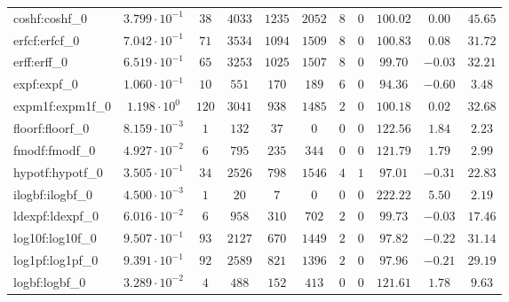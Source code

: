 \begin{tabular}{|l|c|c|c|c|c|c|c|c|c|c|}
coshf:coshf\_0               & $ 3.799 \cdot 10^{-1} $ & $ 38     $ & $ 4033  $ & $ 1235  $ & $ 2052  $ & $ 8   $ & $ 0 $ & $ 100.02      $ & $ 0.00    $ & $ 45.65   $ \\
erfcf:erfcf\_0               & $ 7.042 \cdot 10^{-1} $ & $ 71     $ & $ 3534  $ & $ 1094  $ & $ 1509  $ & $ 8   $ & $ 0 $ & $ 100.83      $ & $ 0.08    $ & $ 31.72   $ \\
erff:erff\_0                 & $ 6.519 \cdot 10^{-1} $ & $ 65     $ & $ 3253  $ & $ 1025  $ & $ 1507  $ & $ 8   $ & $ 0 $ & $ 99.70       $ & $ -0.03   $ & $ 32.21   $ \\
expf:expf\_0                 & $ 1.060 \cdot 10^{-1} $ & $ 10     $ & $ 551   $ & $ 170   $ & $ 189   $ & $ 6   $ & $ 0 $ & $ 94.36       $ & $ -0.60   $ & $ 3.48    $ \\
expm1f:expm1f\_0             & $ 1.198 \cdot 10^{0}  $ & $ 120    $ & $ 3041  $ & $ 938   $ & $ 1485  $ & $ 2   $ & $ 0 $ & $ 100.18      $ & $ 0.02    $ & $ 32.68   $ \\
floorf:floorf\_0             & $ 8.159 \cdot 10^{-3} $ & $ 1      $ & $ 132   $ & $ 37    $ & $ 0     $ & $ 0   $ & $ 0 $ & $ 122.56      $ & $ 1.84    $ & $ 2.23    $ \\
fmodf:fmodf\_0               & $ 4.927 \cdot 10^{-2} $ & $ 6      $ & $ 795   $ & $ 235   $ & $ 344   $ & $ 0   $ & $ 0 $ & $ 121.79      $ & $ 1.79    $ & $ 2.99    $ \\
hypotf:hypotf\_0             & $ 3.505 \cdot 10^{-1} $ & $ 34     $ & $ 2526  $ & $ 798   $ & $ 1546  $ & $ 4   $ & $ 1 $ & $ 97.01       $ & $ -0.31   $ & $ 22.83   $ \\
ilogbf:ilogbf\_0             & $ 4.500 \cdot 10^{-3} $ & $ 1      $ & $ 20    $ & $ 7     $ & $ 0     $ & $ 0   $ & $ 0 $ & $ 222.22      $ & $ 5.50    $ & $ 2.19    $ \\
ldexpf:ldexpf\_0             & $ 6.016 \cdot 10^{-2} $ & $ 6      $ & $ 958   $ & $ 310   $ & $ 702   $ & $ 2   $ & $ 0 $ & $ 99.73       $ & $ -0.03   $ & $ 17.46   $ \\
log10f:log10f\_0             & $ 9.507 \cdot 10^{-1} $ & $ 93     $ & $ 2127  $ & $ 670   $ & $ 1449  $ & $ 2   $ & $ 0 $ & $ 97.82       $ & $ -0.22   $ & $ 31.14   $ \\
log1pf:log1pf\_0             & $ 9.391 \cdot 10^{-1} $ & $ 92     $ & $ 2589  $ & $ 821   $ & $ 1396  $ & $ 2   $ & $ 0 $ & $ 97.96       $ & $ -0.21   $ & $ 29.19   $ \\
logbf:logbf\_0               & $ 3.289 \cdot 10^{-2} $ & $ 4      $ & $ 488   $ & $ 152   $ & $ 413   $ & $ 0   $ & $ 0 $ & $ 121.61      $ & $ 1.78    $ & $ 9.63    $ \\

\end{tabular}
